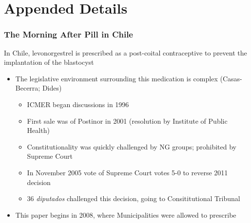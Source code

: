 \documentclass[10pt,letterpaper,subeqn]{beamer}
\begin{document}
\section{Appended Details}

\begin{frame}[label=PAE]
\frametitle{The Morning After Pill in Chile}
In Chile, levonorgestrel is prescribed as a post-coital contraceptive to prevent the implantation
of the blastocyst\\
\vspace{5mm}
\begin{itemize}
\item The legislative environment surrounding this medication is complex (Casas-Becerra; Dides)
\begin{itemize}
\item ICMER began discussions in 1996
\item First sale was of Postinor in 2001 (resolution by Institute of Public Health)
\item Constitutionality was quickly challenged by NG groups; prohibited by Supreme Court
\item In November 2005 vote of Supreme Court votes 5-0 to reverse 2011 decision
\item 36 \emph{diputados} challenged this decision, going to Consititutional Tribunal
\end{itemize}
\item This paper begins in 2008, where Municipalities were allowed to prescribe
\end{itemize}
\hyperlink{Context}{}
\end{frame}

\begin{frame}[label=sumR]

\hyperlink{sum}{}
\end{frame}

\begin{frame}[label=plausR]

\hyperlink{plaus}{}
\end{frame}
\end{document}
